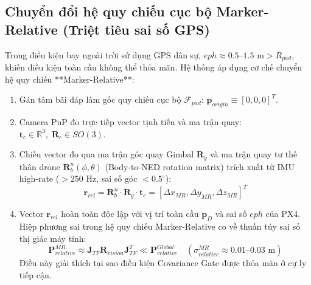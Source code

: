 \documentclass[12pt,a4paper]{article}
\begin{document}
\subsection{Chuyển đổi hệ quy chiếu cục bộ Marker-Relative (Triệt tiêu sai số GPS)}
Trong điều kiện bay ngoài trời sử dụng GPS dân sự, $eph \approx 0.5$--$1.5\text{ m} > R_{pad}$, khiến điều kiện toàn cầu không thể thỏa mãn. Hệ thống áp dụng cơ chế chuyển hệ quy chiếu **Marker-Relative**:
\begin{enumerate}[noitemsep,topsep=2pt]
    \item Gán tâm bãi đáp làm gốc quy chiếu cục bộ $\mathcal{F}_{pad}$: $\mathbf{p}_{origin} \equiv [0, 0, 0]^T$.
    \item Camera PnP đo trực tiếp vector tịnh tiến và ma trận quay: $\mathbf{t}_c \in \mathbb{R}^3, \; \mathbf{R}_c \in SO(3)$.
    \item Chiếu vector đo qua ma trận góc quay Gimbal $\mathbf{R}_g$ và ma trận quay tư thế thân drone $\mathbf{R}_b^n(\phi, \theta)$ (Body-to-NED rotation matrix) trích xuất từ IMU high-rate ($>250\text{ Hz}$, sai số góc $< 0.5^\circ$):
    \begin{equation}
        \mathbf{r}_{rel} = \mathbf{R}_b^n \cdot \mathbf{R}_g \cdot \mathbf{t}_c = [\Delta x_{MR}, \Delta y_{MR}, \Delta z_{MR}]^T
    \end{equation}
    \item Vector $\mathbf{r}_{rel}$ hoàn toàn độc lập với vị trí toàn cầu $\mathbf{p}_D$ và sai số $eph$ của PX4. Hiệp phương sai trong hệ quy chiếu Marker-Relative co về thuần túy sai số thị giác máy tính:
    \begin{equation}
        \mathbf{P}_{relative}^{MR} \approx \mathbf{J}_{TF} \mathbf{R}_{vision} \mathbf{J}_{TF}^T \ll \mathbf{P}_{relative}^{Global} \quad (\sigma_{relative}^{MR} \approx 0.01\text{--}0.03\text{ m})
    \end{equation}
    Điều này giải thích tại sao điều kiện Covariance Gate được thỏa mãn ở cự ly tiếp cận.
\end{enumerate}
\end{document}
